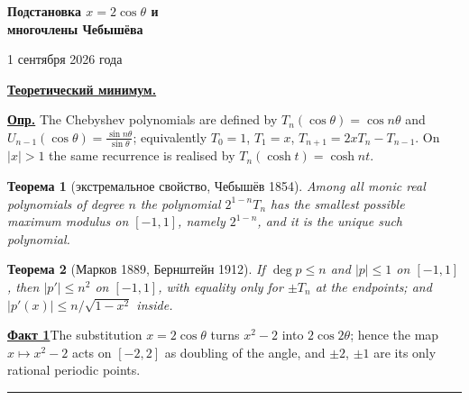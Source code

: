 \documentclass[11pt,a4paper]{article}
\renewcommand{\le}{\leqslant}
\theoremstyle{ruthm}
\newtheorem{thm}{\foreignlanguage{russian}{Теорема}}
\newcommand{\ul}[1]{\underline{\textbf{#1}}}
\begin{document}
\begin{center}
{\huge\bfseries\foreignlanguage{russian}{Подстановка $x=2\cos\theta$ и\\ многочлены Чебышёва}\par}\vspace{1.2em}
{\foreignlanguage{russian}{1 сентября 2026 года}\par}
\end{center}\vspace{0.5em}

\noindent\ul{\foreignlanguage{russian}{Теоретический минимум.}}\par\medskip

\ul{\foreignlanguage{russian}{Опр.}} The Chebyshev polynomials are defined by $T_n(\cos\theta)=\cos n\theta$
and $U_{n-1}(\cos\theta)=\frac{\sin n\theta}{\sin\theta}$; equivalently $T_0=1$, $T_1=x$,
$T_{n+1}=2xT_n-T_{n-1}$. On $|x|>1$ the same recurrence is realised by $T_n(\cosh t)=\cosh nt$.

\begin{thm}[\foreignlanguage{russian}{экстремальное свойство, Чебышёв 1854}]
Among all monic real polynomials of degree $n$ the polynomial $2^{1-n}T_n$ has the smallest possible
maximum modulus on $[-1,1]$, namely $2^{1-n}$, and it is the unique such polynomial.
\end{thm}

\begin{thm}[\foreignlanguage{russian}{Марков 1889, Бернштейн 1912}]
If $\deg p\le n$ and $|p|\le1$ on $[-1,1]$, then $|p'|\le n^2$ on $[-1,1]$, with equality only for
$\pm T_n$ at the endpoints; and $|p'(x)|\le n/\sqrt{1-x^2}$ inside.
\end{thm}

\medskip
\ul{\foreignlanguage{russian}{Факт 1}}\quad The substitution $x=2\cos\theta$ turns $x^2-2$ into
$2\cos2\theta$; hence the map $x\mapsto x^2-2$ acts on $[-2,2]$ as doubling of the angle, and $\pm2$,
$\pm1$ are its only rational periodic points.

\medskip
\noindent\rule{\textwidth}{0.4pt}\par\medskip
\end{document}
